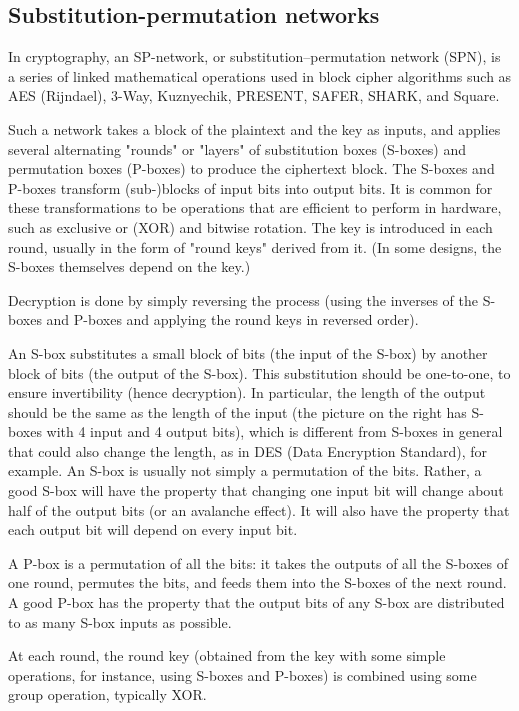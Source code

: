 \subsection{Substitution-permutation networks}
\begin{definition}
In cryptography, an SP-network, or substitution–permutation network (SPN), is a series of linked mathematical operations used in block cipher algorithms such as AES (Rijndael), 3-Way, Kuznyechik, PRESENT, SAFER, SHARK, and Square.

Such a network takes a block of the plaintext and the key as inputs, and applies several alternating "rounds" or "layers" of substitution boxes (S-boxes) and permutation boxes (P-boxes) to produce the ciphertext block. The S-boxes and P-boxes transform (sub-)blocks of input bits into output bits. It is common for these transformations to be operations that are efficient to perform in hardware, such as exclusive or (XOR) and bitwise rotation. The key is introduced in each round, usually in the form of "round keys" derived from it. (In some designs, the S-boxes themselves depend on the key.)

Decryption is done by simply reversing the process (using the inverses of the S-boxes and P-boxes and applying the round keys in reversed order).

An S-box substitutes a small block of bits (the input of the S-box) by another block of bits (the output of the S-box). This substitution should be one-to-one, to ensure invertibility (hence decryption). In particular, the length of the output should be the same as the length of the input (the picture on the right has S-boxes with 4 input and 4 output bits), which is different from S-boxes in general that could also change the length, as in DES (Data Encryption Standard), for example. An S-box is usually not simply a permutation of the bits. Rather, a good S-box will have the property that changing one input bit will change about half of the output bits (or an avalanche effect). It will also have the property that each output bit will depend on every input bit.

A P-box is a permutation of all the bits: it takes the outputs of all the S-boxes of one round, permutes the bits, and feeds them into the S-boxes of the next round. A good P-box has the property that the output bits of any S-box are distributed to as many S-box inputs as possible.

At each round, the round key (obtained from the key with some simple operations, for instance, using S-boxes and P-boxes) is combined using some group operation, typically XOR.


\end{definition}
